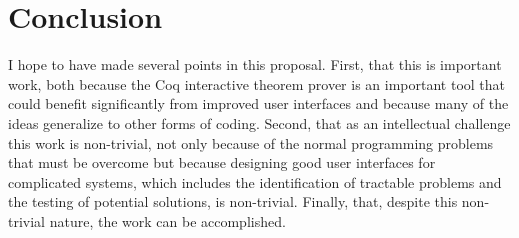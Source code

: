 \documentclass[11pt]{amsart}
\begin{document}
%
%
%
%
%
%
%
%
%
%
%

\section{Conclusion}

I hope to have made several points in this proposal.  First, that this is important work, both because the Coq interactive theorem prover is an important tool that could benefit significantly from improved user interfaces and because many of the ideas generalize to other forms of coding.  Second, that as an intellectual challenge this work is non-trivial, not only because of the normal programming problems that must be overcome but because designing good user interfaces for complicated systems, which includes the identification of tractable problems and the testing of potential solutions, is non-trivial.  Finally, that, despite this non-trivial nature, the work can be accomplished.




\end{document}
